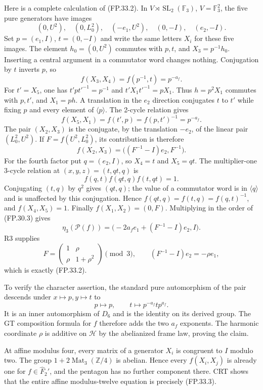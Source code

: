 Here is a complete calculation of (FP.33.2).
In $V\rtimes\operatorname{SL}_2(\mathbb F_3)$, $V=\mathbb F_3^2$,
the five pure generators have images
\[
 (0,U^2),\quad(0,L_0^2),\quad(-e_1,U^2),\quad
 (0,-I),\quad(e_2,-I).
 \tag{FP.33.4}
\]
Set $p=(e_1,I)$, $t=(0,-I)$ and write the same letters $X_i$
for these five images. The element $h_0=(0,U^2)$ commutes with
$p,t$, and $X_3=p^{-1}h_0$. Inserting a central argument in a
commutator word changes nothing. Conjugation by $t$ inverts $p$,
so
\[
 f(X_3,X_4)=f(p^{-1},t)=p^{-a_f}.
\]
For $t'=X_5$, one has $t'pt'^{-1}=p^{-1}$ and
$t'X_1t'^{-1}=pX_1$. Thus $h=p^2X_1$ commutes with $p,t'$,
and $X_1=ph$. A translation in the $e_2$ direction conjugates
$t$ to $t'$ while fixing $p$ and every element of $\langle p\rangle$.
The 2-cycle relation gives
\[
 f(X_5,X_1)=f(t',p)=f(p,t')^{-1}=p^{-a_f}.
\]
The pair $(X_2,X_3)$ is the conjugate, by the translation $-e_2$,
of the linear pair $(L_0^2,U^2)$. If
$F=f(U^2,L_0^2)$, its contribution is therefore
\[
 f(X_2,X_3)=\bigl((F^{-1}-I)e_2,F^{-1}\bigr).
\]
For the fourth factor put $q=(e_2,I)$, so $X_4=t$ and $X_5=qt$.
The multiplier-one 3-cycle relation at $(x,y,z)=(t,qt,q)$ is
\[
 f(q,t)f(qt,q)f(t,qt)=1.
\]
Conjugating $(t,q)$ by $q^2$ gives $(qt,q)$; the value of a
commutator word is in $\langle q\rangle$ and is unaffected by this
conjugation. Hence $f(qt,q)=f(t,q)=f(q,t)^{-1}$, and
$f(X_4,X_5)=1$. Finally $f(X_1,X_2)=(0,F)$.
Multiplying in the order of (FP.30.3) gives
\[
 \eta_3(\mathcal P(f))
       =\bigl(-2a_f e_1+(F^{-1}-I)e_2,I\bigr).
\]
R3 supplies
\[
 F=\begin{pmatrix}1&\rho\\\rho&1+\rho^2\end{pmatrix}\pmod3,
 \qquad (F^{-1}-I)e_2=-\rho e_1,
\]
which is exactly (FP.33.2).

To verify the character assertion, the standard pure automorphism of
the pair descends under $x\mapsto p,y\mapsto t$ to
\[
 p\longmapsto p,\qquad
 t\longmapsto p^{-a_f}tp^{a_f}.
\]
It is an inner automorphism of $D_6$ and is the identity on its
derived group. The GT composition formula for $f$ therefore adds
the two $a_f$ exponents. The harmonic coordinate $\rho$ is additive
on $\mathcal H$ by the abelianized frame law, proving the claim.

At affine modulus four, every matrix of a generator $X_i$ is
congruent to $I$ modulo two. The group
$1+2\operatorname{Mat}_3(\mathbb Z/4)$ is abelian. Hence every
$f(X_i,X_j)$ is already one for $f\in\widehat F_2'$, and the
pentagon has no further component there. CRT shows that the entire
affine modulus-twelve equation is precisely (FP.33.3).

